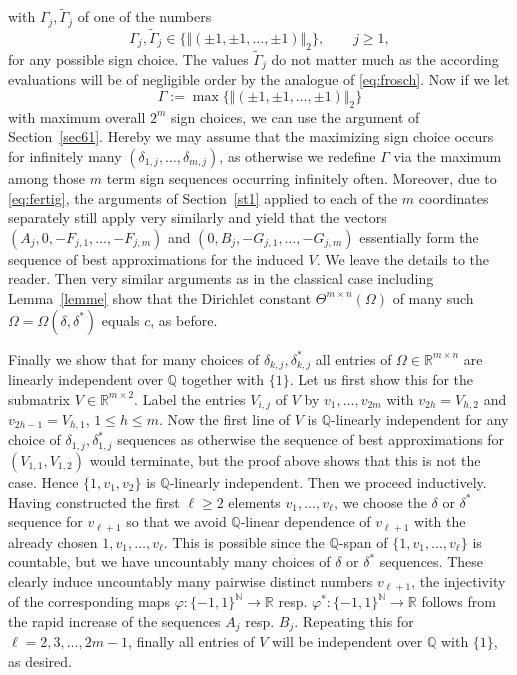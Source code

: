 \documentclass[10pt]{amsart}
\theoremstyle{definition}
\newcommand{\R}{\mathbb{R}}
\newcommand{\Q}{\mathbb{Q}}
\begin{document}
 with $\Gamma_j, \tilde{\Gamma}_j$ of one of the numbers
 \[
  \Gamma_j, \tilde{\Gamma}_j \in \{ \Vert (\pm 1,\pm 1,\ldots,\pm 1)\Vert_2\}, \qquad j\ge 1,
 \]
 for any possible sign choice. 
 The values $\tilde{\Gamma}_j$ do not matter much as 
 the according evaluations 
 will be of negligible order by 
 the analogue of \eqref{eq:frosch}. 
 Now if we let 
 \[
 \Gamma:= \max\{ \Vert (\pm 1,\pm 1,\ldots,\pm 1)\Vert_2 \}
 \]
 with maximum overall $2^m$ sign choices,
 we can use the argument of Section~\ref{sec61}. Hereby we may assume that the maximizing sign choice occurs for infinitely many $(\delta_{1,j}, \ldots, \delta_{m,j})$, as otherwise we redefine $\Gamma$ via the maximum among those $m$ term sign sequences occurring infinitely often.
 Moreover, due to \eqref{eq:fertig}, the arguments of
    Section~\ref{st1} applied to each of the $m$ coordinates separately still apply very similarly
    and yield that the vectors $(A_j, 0 , -F_{j,1},\ldots,-F_{j,m})$ and
    $(0 , B_j, -G_{j,1},\ldots,-G_{j,m})$ essentially form the sequence of best approximations for the induced $V$. We leave the details to the reader. Then very similar arguments as in the classical case
    including Lemma~\ref{lemme} show that the Dirichlet constant $\Theta^{m\times n}(\Omega)$ of many such $\Omega=\Omega(\delta,\delta^{\ast})$ equals $c$, as before. 
	
	Finally we show that for many choices of $\delta_{k,j}, \delta_{k,j}^{\ast}$ all entries
	of $\Omega\in\R^{m\times n}$ are linearly independent over $\Q$ together 
	with $\{1\}$. Let us first show this for the submatrix $V\in\R^{m\times 2}$. 
	Label the entries $V_{i,j}$ of $V$ by $v_1,\ldots,v_{2m}$ with
	$v_{2h}=V_{h,2}$ and $v_{2h-1}=V_{h,1}$, $1\le h\le m$.
	Now the first line of $V$ is $\Q$-linearly independent 
	for any choice of $\delta_{1,j}, \delta_{1,j}^{\ast}$ sequences
	as otherwise the sequence
	of best approximations for $(V_{1,1}, V_{1,2})$ 
	would terminate, but the proof above shows that this is not the case. 
	Hence $\{ 1,v_1, v_2\}$ is
	$\Q$-linearly independent. Then we proceed inductively.
	Having constructed the first $\ell\ge 2$ elements $v_1, \ldots,v_{\ell}$, we choose the $\delta$ or $\delta^{\ast}$ sequence for $v_{\ell+1}$ so that we avoid
	$\Q$-linear dependence of $v_{\ell+1}$ with the already chosen 
	$1,v_1, \ldots,v_{\ell}$. This is possible
	since the $\Q$-span of $\{ 1,v_1,\ldots,v_{\ell} \}$ is countable, but we have uncountably many choices of $\delta$ or $\delta^{\ast}$ sequences. These clearly induce uncountably many pairwise distinct numbers $v_{\ell+1}$,
	the injectivity  of the corresponding maps $\varphi: \{-1,1\}^{\mathbb{N}}\to \R$ resp. $\varphi^{\ast}: \{-1,1\}^{\mathbb{N}}\to \R$
	follows from the rapid increase of the sequences $A_j$ resp. $B_j$. Repeating
	this for $\ell=2,3,\ldots,2m-1$, finally all entries of $V$ will be
	independent over $\Q$ with $\{1\}$, as desired. 
	
\end{document}
